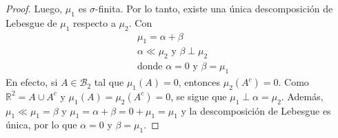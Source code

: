 \documentclass[12pt]{article}
\begin{document}
\begin{proof}
    Luego, \( \mu_1  \) es \( \sigma  \)-finita. Por lo tanto, existe una única descomposición de Lebesgue de \( \mu_1  \) respecto a \( \mu_2  \). Con\begin{align*}
        & \mu_1 = \alpha + \beta \\
        & \alpha \ll \mu_2 \text{ y } \beta \perp \mu_2 \\
        & \text{donde } \alpha = 0 \text{ y } \beta = \mu_1
    \end{align*}
    En efecto, si \( A \in \mathcal{B}_2  \) tal que \( \mu_1(A) = 0  \), entonces \( \mu_2(A^c) = 0  \). Como \( \mathbb{R}^2 = A \cup A^c  \) y \( \mu_1(A) = \mu_2(A^c) = 0  \), se sigue que \( \mu_1 \perp \alpha = \mu_2  \).
    Además, \( \mu_1 \ll \mu_1 = \beta  \) y \( \mu_1 = \alpha + \beta = 0 + \mu_1  = \mu_1  \) y la descomposición de Lebesgue es única, por lo que \( \alpha = 0  \) y \( \beta = \mu_1  \).
\end{proof}
\end{document}
